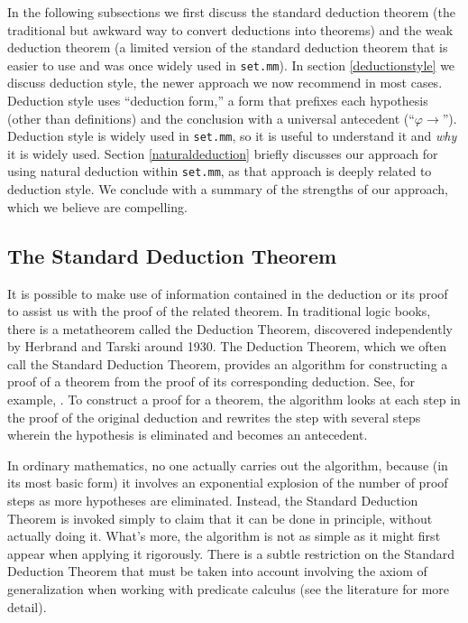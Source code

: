 In the following subsections we first discuss the standard deduction theorem
(the traditional but awkward way to convert deductions into theorems) and
the weak deduction theorem (a limited version of the standard deduction
theorem that is easier to use and was once widely used in
\texttt{set.mm}).
In section \ref{deductionstyle} we discuss
deduction style, the newer approach we now recommend in most cases.
Deduction style uses ``deduction form,'' a form that
prefixes each hypothesis (other than definitions) and the
conclusion with a universal antecedent (``$\varphi \rightarrow$'').
Deduction style is widely used in \texttt{set.mm},
so it is useful to understand it and \textit{why} it is widely used.
Section \ref{naturaldeduction}
briefly discusses our approach for using natural deduction
within \texttt{set.mm},
as that approach is deeply related to deduction style.
We conclude with a summary of the strengths of
our approach, which we believe are compelling.

\subsection{The Standard Deduction Theorem}\label{standarddeductiontheorem}

It is possible to make use of information
contained in the deduction or its proof to assist us with the proof of
the related theorem.
In traditional logic books, there is a metatheorem called the
Deduction Theorem,
discovered independently by Herbrand and Tarski around 1930.
The Deduction Theorem, which we often call the Standard Deduction Theorem,
provides an algorithm for constructing a proof of a theorem from the
proof of its corresponding deduction. See, for example,
\cite[p.~56]{Margaris}.
To construct a proof for a theorem, the
algorithm looks at each step in the proof of the original deduction and
rewrites the step with several steps wherein the hypothesis is eliminated
and becomes an antecedent.

In ordinary mathematics, no one actually carries out the algorithm,
because (in its most basic form) it involves an exponential explosion of
the number of proof steps as more hypotheses are eliminated. Instead,
the Standard Deduction Theorem is invoked simply to claim that it can
be done in principle, without actually doing it.
What's more, the algorithm is not as simple as it might first appear
when applying it rigorously.
There is a subtle restriction on the Standard Deduction Theorem
that must be taken into account involving the axiom of generalization
when working with predicate calculus (see the literature for more detail).

